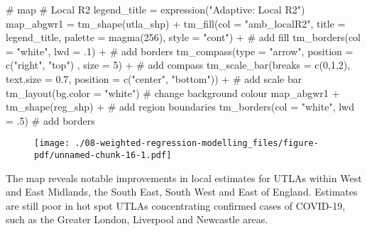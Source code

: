 \documentclass[
  letterpaper,
  krantz2]{style/krantz}
\newenvironment{Shaded}{\begin{snugshade}}{\end{snugshade}}
\newcommand{\AttributeTok}[1]{\textcolor[rgb]{0.40,0.45,0.13}{#1}}
\newcommand{\CommentTok}[1]{\textcolor[rgb]{0.37,0.37,0.37}{#1}}
\newcommand{\DecValTok}[1]{\textcolor[rgb]{0.68,0.00,0.00}{#1}}
\newcommand{\FloatTok}[1]{\textcolor[rgb]{0.68,0.00,0.00}{#1}}
\newcommand{\FunctionTok}[1]{\textcolor[rgb]{0.28,0.35,0.67}{#1}}
\newcommand{\NormalTok}[1]{\textcolor[rgb]{0.00,0.23,0.31}{#1}}
\newcommand{\OtherTok}[1]{\textcolor[rgb]{0.00,0.23,0.31}{#1}}
\newcommand{\SpecialCharTok}[1]{\textcolor[rgb]{0.37,0.37,0.37}{#1}}
\newcommand{\StringTok}[1]{\textcolor[rgb]{0.13,0.47,0.30}{#1}}
\begin{document}
\begin{Shaded}
\begin{Highlighting}[]
\CommentTok{\# map}
  \CommentTok{\# Local R2}
\NormalTok{legend\_title }\OtherTok{=} \FunctionTok{expression}\NormalTok{(}\StringTok{"Adaptive: Local R2"}\NormalTok{)}
\NormalTok{map\_abgwr1 }\OtherTok{=} \FunctionTok{tm\_shape}\NormalTok{(utla\_shp) }\SpecialCharTok{+}
  \FunctionTok{tm\_fill}\NormalTok{(}\AttributeTok{col =} \StringTok{"amb\_localR2"}\NormalTok{, }\AttributeTok{title =}\NormalTok{ legend\_title, }\AttributeTok{palette =} \FunctionTok{magma}\NormalTok{(}\DecValTok{256}\NormalTok{), }\AttributeTok{style =} \StringTok{"cont"}\NormalTok{) }\SpecialCharTok{+} \CommentTok{\# add fill}
  \FunctionTok{tm\_borders}\NormalTok{(}\AttributeTok{col =} \StringTok{"white"}\NormalTok{, }\AttributeTok{lwd =}\NormalTok{ .}\DecValTok{1}\NormalTok{)  }\SpecialCharTok{+} \CommentTok{\# add borders}
  \FunctionTok{tm\_compass}\NormalTok{(}\AttributeTok{type =} \StringTok{"arrow"}\NormalTok{, }\AttributeTok{position =} \FunctionTok{c}\NormalTok{(}\StringTok{"right"}\NormalTok{, }\StringTok{"top"}\NormalTok{) , }\AttributeTok{size =} \DecValTok{5}\NormalTok{) }\SpecialCharTok{+} \CommentTok{\# add compass}
  \FunctionTok{tm\_scale\_bar}\NormalTok{(}\AttributeTok{breaks =} \FunctionTok{c}\NormalTok{(}\DecValTok{0}\NormalTok{,}\DecValTok{1}\NormalTok{,}\DecValTok{2}\NormalTok{), }\AttributeTok{text.size =} \FloatTok{0.7}\NormalTok{, }\AttributeTok{position =}  \FunctionTok{c}\NormalTok{(}\StringTok{"center"}\NormalTok{, }\StringTok{"bottom"}\NormalTok{)) }\SpecialCharTok{+} \CommentTok{\# add scale bar}
  \FunctionTok{tm\_layout}\NormalTok{(}\AttributeTok{bg.color =} \StringTok{"white"}\NormalTok{) }\CommentTok{\# change background colour}
\NormalTok{map\_abgwr1 }\SpecialCharTok{+} \FunctionTok{tm\_shape}\NormalTok{(reg\_shp) }\SpecialCharTok{+} \CommentTok{\# add region boundaries}
  \FunctionTok{tm\_borders}\NormalTok{(}\AttributeTok{col =} \StringTok{"white"}\NormalTok{, }\AttributeTok{lwd =}\NormalTok{ .}\DecValTok{5}\NormalTok{) }\CommentTok{\# add borders}
\end{Highlighting}
\end{Shaded}

\begin{figure}[H]

{\centering \texttt{[image: ./08-weighted-regression-modelling\_files/figure-pdf/unnamed-chunk-16-1.pdf]}

}

\end{figure}

The map reveals notable improvements in local estimates for UTLAs within
West and East Midlands, the South East, South West and East of England.
Estimates are still poor in hot spot UTLAs concentrating confirmed cases
of COVID-19, such as the Greater London, Liverpool and Newcastle areas.
\end{document}
